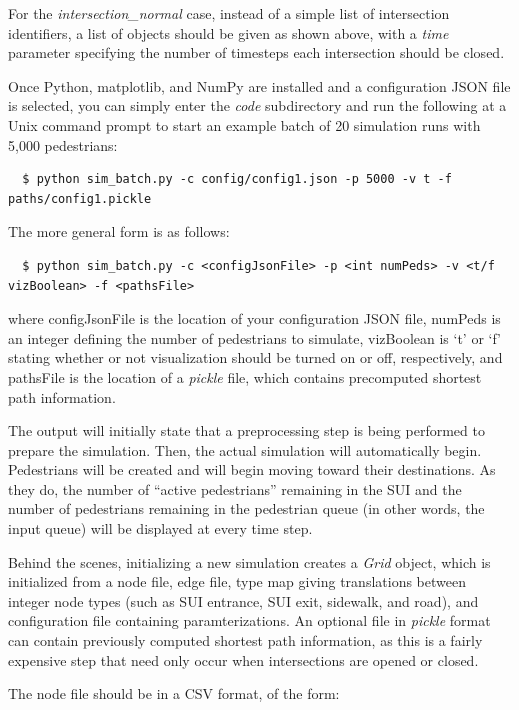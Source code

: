 \documentclass[12pt]{article}
\begin{document}
For the \textit{intersection\_normal} case, instead of a simple list of
intersection identifiers, a list of objects should be given as shown above, with
a \textit{time} parameter specifying the number of timesteps each intersection
should be closed.

Once Python, matplotlib, and NumPy are installed and a configuration JSON file
is selected, you can simply enter the \textit{code} subdirectory and run the
following at a Unix command prompt to start an example batch of 20 simulation
runs with 5,000 pedestrians:

\begin{lstlisting}
  $ python sim_batch.py -c config/config1.json -p 5000 -v t -f paths/config1.pickle
\end{lstlisting}

The more general form is as follows:
\\
\begin{lstlisting}
  $ python sim_batch.py -c <configJsonFile> -p <int numPeds> -v <t/f vizBoolean> -f <pathsFile>
\end{lstlisting}

where configJsonFile is the location of your configuration JSON file, numPeds is
an integer defining the number of pedestrians to simulate, vizBoolean is `t'
or `f' stating whether or not visualization should be turned on or off,
respectively, and pathsFile is the location of a \textit{pickle} file, which
contains precomputed shortest path information.

The output will initially state that a preprocessing step is being performed
to prepare the simulation. Then, the actual simulation will automatically begin.
Pedestrians will be created and will begin moving toward their destinations. As
they do, the number of ``active pedestrians'' remaining in the SUI and the
number of pedestrians remaining in the pedestrian queue (in other words, the
input queue) will be displayed at every time step.

Behind the scenes, initializing a new simulation creates a
\textit{Grid} object, which is initialized from a node file, edge file,
type map giving translations between integer node types (such as SUI entrance,
SUI exit, sidewalk, and road), and configuration file containing
paramterizations. An optional file in \textit{pickle} format can
contain previously computed shortest path information, as this is a fairly
expensive step that need only occur when intersections are opened or closed.

The node file should be in a CSV format, of the form:
\end{document}
